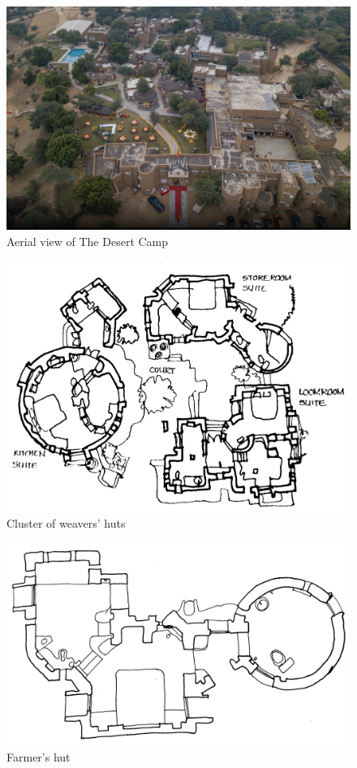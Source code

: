 \begin{figure}[H]
  \centering
  \includegraphics[angle=90,width=1.0\textwidth]{img/dc-av}
  \caption{Aerial view of The Desert Camp}
  \label{fig:dc-av} 
\end{figure}

\begin{figure}[H]
  \centering
  \includegraphics[angle=0,width=1.0\textwidth]{img/dc-03}
  \caption{Cluster of weavers' huts}
  \label{fig:dc-03} 
\end{figure}

\begin{figure}[H]
  \centering
  \includegraphics[angle=0,width=1.0\textwidth]{img/dc-04}
  \caption{Farmer's hut}
  \label{fig:dc-04} 
\end{figure}

